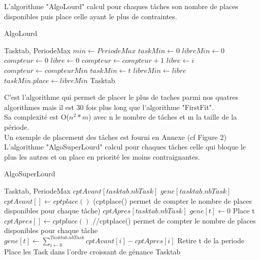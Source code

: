 \documentclass[11pt]{article}
\begin{document}
\newpage
L'algorithme "AlgoLourd" calcul pour chaques tâches son nombre de places disponibles puis place celle ayant le plus de contraintes.\\
\begin{algorithm}
    \caption{AlgoLourd}
    \begin{algorithmic}
    \REQUIRE Tasktab, PeriodeMax
    \STATE $min \leftarrow PeriodeMax$
    \STATE $taskMin \leftarrow 0$
    \STATE $libreMin \leftarrow 0$
        \STATE $compteur \leftarrow 0$
        \STATE $libre \leftarrow 0$
                    \STATE $compteur \leftarrow compteur + 1$
                    \STATE $libre \leftarrow i$
                \ENDIF
            \ENDFOR
                \STATE $compteur \leftarrow compteurMin$
                \STATE $taskMin \leftarrow t$
                \STATE $libreMin \leftarrow libre$
            \ENDIF
        \ENDFOR
        \STATE $taskMin.place \leftarrow libreMin$
    \ENDFOR
    \RETURN Tasktab
    \end{algorithmic}
\end{algorithm}

C'est l'algorithme qui permet de placer le plus de taches parmi nos quatres algorithmes mais il est 30 fois plus long que l'algorithme "FirstFit".\\
Sa complexité est O($n^2*m$) avec n le nombre de tâches et m la taille de la période.\\ 
Un exemple de placement des tâches est fourni en Annexe (cf Figure 2)\\

\newpage
L'algorithme "AlgoSuperLourd" calcul pour chaques tâches celle qui bloque le plus les autres et on place en priorité les moins contraignantes.\\
\begin{algorithm}
    \caption{AlgoSuperLourd}
    \begin{algorithmic}
    \REQUIRE Tasktab, PeriodeMax
    \STATE $cptAvant[tasktab.nbTask]$
    \STATE $gene[tasktab.nbTask]$
        \STATE $cptAvant[] \leftarrow cptplace()$ (cptplace() permet de compter le nombre de places disponibles pour chaque tâche)
        \STATE $cptApres[tasktab.nbTask]$
            \STATE $gene[t] \leftarrow 0$
                    \STATE Place t
                \ENDIF
            \ENDFOR
            \STATE $cptApres[] \leftarrow cptplace()$ //cptplace() permet de compter le nombre de places disponibles pour chaque tâche
            \STATE $gene[t] \leftarrow \sum\limits_{i\leftarrow0}^{Tasktab.nbTask} cptAvant[i] - cptApres[i]$
            \STATE Retire t de la periode
        \ENDFOR
        \STATE Place les Task dans l'ordre croissant de génance
    \ENDFOR
    \RETURN Tasktab
    \end{algorithmic}
\end{algorithm}
\end{document}
